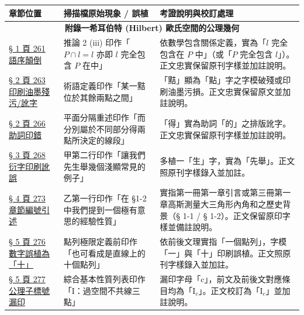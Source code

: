 \documentclass[a4paper,12pt,twoside]{article}
\begin{document}
\begin{table}[H]
\centering
\small
\renewcommand{\arraystretch}{1.35}
\begin{tabularx}{\textwidth}{|p{3.2cm}|p{3.8cm}|X|}
\hline
\textbf{章節位置} & \textbf{掃描檔原始現象 / 誤植} & \textbf{考證說明與校訂處理} \\ \hline

\multicolumn{3}{|c|}{\textbf{附錄一\quad 希耳伯特 (Hilbert) 歐氏空間的公理幾何}} \\ \hline

\hyperref[note:b3s-a1-p261-order]{§ 1 頁 261 語序顛倒} & 
推論 2 (iii) 印作「$P \cap l = l$ 亦即 $l$ 完全包含 $P$ 在中」 & 
依數學包含關係定義，實為「$l$ 完全包含在 $P$ 中」（或「$P$ 完全包含 $l$」）。正文忠實保留原刊字樣並加註說明。 \\ \hline

\hyperref[note:b3s-a1-p263-point]{§ 2 頁 263 印刷油墨殘污/訛字} & 
術語定義印作「某一黠位於其餘兩點之間」 & 
「黠」顯為「點」字之字模破殘或印刷油墨污損。正文忠實保留原文並加註說明。 \\ \hline

\hyperref[note:b3s-a1-p266-de]{§ 2 頁 266 助詞印錯} & 
平面分隔重述印作「而分別屬於不同部分得兩點所決定的線段」 & 
「得」實為助詞「的」之排版訛字。正文忠實保留原刊字樣並加註說明。 \\ \hline

\hyperref[note:b3s-a1-p268-xian]{§ 3 頁 268 衍字印刷訛誤} & 
甲第二行印作「讓我們先生舉幾個淺顯常見的例子」 & 
多植一「生」字，實為「先舉」。正文照原刊字樣錄入並加註。 \\ \hline

\hyperref[note:b3s-a1-p273-sec]{§ 4 頁 273 章節編號引述} & 
乙第一行印作「在 \S 1-2 中我們提到一個極有意思的經驗性質」 & 
實指第一冊第一章引言或第三冊第一章高斯測量大三角形內角和之歷史背景（§ 1-1 / § 1-2）。正文保留原印字樣並備註說明。 \\ \hline

\hyperref[note:b3s-a1-p276-ten]{§ 5 頁 276 數字誤植為「十」} & 
點列極限定義前印作「也可看成是直線上的十個點列」 & 
依前後文理實指「一個點列」，字模「一」與「十」印刷誤植。正文照原刊字樣錄入並加註。 \\ \hline

\hyperref[note:b3s-a1-p277-ic]{§ 5 頁 277 公理子標號漏印} & 
綜合基本性質列表印作「$\mathrm{I}$：過空間不共線三點」 & 
漏印字母「c」，前文及前後文對應條目均為「$\mathrm{I}_c$」。正文校訂為「$\mathrm{I}_c$」並加註說明。 \\ \hline


\end{tabularx}
\end{table}
\end{document}
